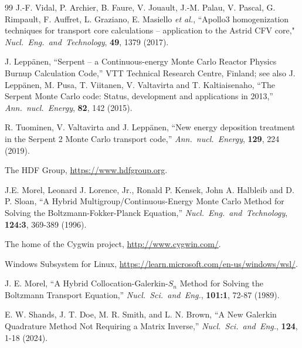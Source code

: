 \begin{thebibliography}{99}
J.-F. Vidal, P. Archier, B. Faure, V. Jouault, J.-M. Palau, V. Pascal, G. Rimpault, F. Auffret, L. Graziano, E. Masiello {\sl et al.}, ``Apollo3
homogenization techniques for transport core calculations -- application to the Astrid CFV core," {\sl Nucl.~Eng.~and~Technology}, {\bf 49}, 1379 (2017).

J. Lepp\"anen, ``Serpent -- a Continuous-energy Monte Carlo Reactor Physics Burnup Calculation Code,'' VTT Technical Research Centre, Finland; see also J. Lepp\"anen, M. Pusa, T. Viitanen, V. Valtavirta and T. Kaltiaisenaho, ``The Serpent Monte Carlo code: Status, development and applications in 2013,'' {\sl Ann.~nucl.~Energy}, {\bf 82}, 142 (2015).

R. Tuominen, V. Valtavirta and J. Lepp\"anen, ``New energy deposition treatment in the Serpent 2 Monte Carlo transport code,'' {\sl Ann.~nucl.~Energy}, {\bf 129}, 224 (2019).

The HDF Group, \url{https://www.hdfgroup.org}.

J.E. Morel, Leonard J. Lorence, Jr., Ronald P. Kensek, John A. Halbleib and D. P. Sloan, ``A Hybrid Multigroup/Continuous-Energy Monte Carlo Method for
Solving the Boltzmann-Fokker-Planck Equation,'' {\sl Nucl.~Eng.~and~Technology}, {\bf 124:3}, 369-389 (1996).

The home of the Cygwin project, \url{http://www.cygwin.com/}.

Windows Subsystem for Linux, \url{https://learn.microsoft.com/en-us/windows/wsl/}.

J. E. Morel, ``A Hybrid Collocation-Galerkin-$S_n$ Method for Solving the Boltzmann Transport Equation,'' {\sl Nucl.~Sci.~and~Eng.}, {\bf 101:1}, 72-87 (1989).

E. W. Shands, J. T. Doe, M. R. Smith, and L. N. Brown, ``A New Galerkin Quadrature Method Not Requiring a Matrix Inverse,'' {\sl Nucl.~Sci.~and~Eng.}, {\bf 124}, 1-18 (2024).

\end{thebibliography}
